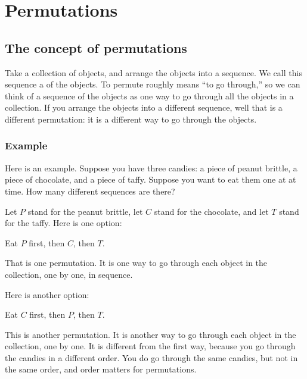 \documentclass[../../../main.tex]{subfiles}
\begin{document}
\chapter{Permutations}


\section{The concept of permutations}

Take a collection of objects, and arrange the objects into a sequence. We call this sequence a  of the objects. To permute roughly means ``to go through,'' so we can think of a sequence of the objects as one way to go through all the objects in a collection. If you arrange the objects into a different sequence, well that is a different permutation: it is a different way to go through the objects.


\subsection{Example}

Here is an example. Suppose you have three candies: a piece of peanut brittle, a piece of chocolate, and a piece of taffy. Suppose you want to eat them one at at time. How many different sequences are there?

Let $P$ stand for the peanut brittle, let $C$ stand for the chocolate, and let $T$ stand for the taffy. Here is one option:

\begin{center}
  Eat $P$ first, then $C$, then $T$.
\end{center}

\noindent
That is one permutation. It is one way to go through each object in the collection, one by one, in sequence.

Here is another option:

\begin{center}
  Eat $C$ first, then $P$, then $T$.
\end{center}

\noindent
This is another permutation. It is another way to go through each object in the collection, one by one. It is different from the first way, because you go through the candies in a different order. You do go through the same candies, but not in the same order, and order matters for permutations.
\end{document}
